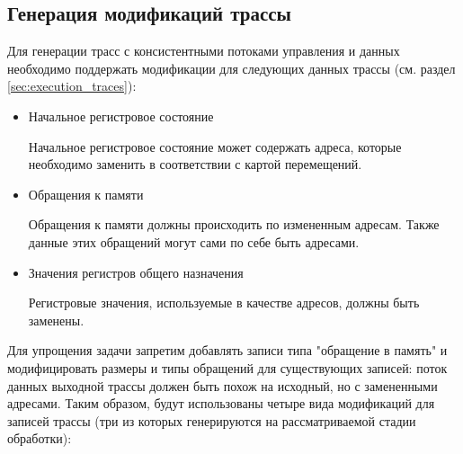\subsection{Генерация модификаций трассы}

Для генерации трасс с консистентными потоками управления и данных необходимо поддержать модификации для следующих данных трассы (см. раздел \ref{sec:execution_traces}):

\begin{itemize}
    \item Начальное регистровое состояние

    Начальное регистровое состояние может содержать адреса, которые необходимо заменить в соответствии с картой перемещений.

    \item Обращения к памяти

    Обращения к памяти должны происходить по измененным адресам. Также данные этих обращений могут сами по себе быть адресами.

    \item Значения регистров общего назначения

    Регистровые значения, используемые в качестве адресов, должны быть заменены.
\end{itemize}

Для упрощения задачи запретим добавлять записи типа "обращение в память" и модифицировать размеры и типы обращений для существующих записей: поток данных выходной трассы должен быть похож на исходный, но с замененными адресами. Таким образом, будут использованы четыре вида модификаций для записей трассы (три из которых генерируются на рассматриваемой стадии обработки):

